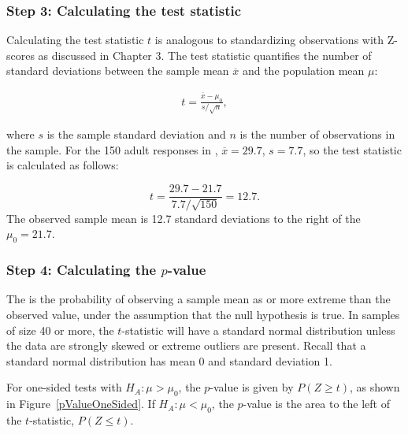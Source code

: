 \begin{spacing}{1.5}

\subsubsection{Step 3: Calculating the test statistic}

Calculating the test statistic $t$ is analogous to standardizing observations with Z-scores as discussed in Chapter 3. The test statistic quantifies the number of standard deviations between the sample mean $\overline{x}$ and the population mean $\mu$:

\begin{align*}
t=\frac{\overline{x}-\mu_0}{s/\sqrt{n}},
\end{align*}

where $s$ is the sample standard deviation and $n$ is the number of observations in the sample. For the 150 adult responses in , $\overline{x} = 29.7$, $s = 7.7$, so the test statistic is calculated as follows:

\[t = \frac{29.7 - 21.7}{7.7/\sqrt{150}} = 12.7.\]
The observed sample mean is 12.7 standard deviations to the right of the $\mu_0 = 21.7$.

\subsubsection{Step 4: Calculating the $p$-value}

The  is the probability of observing a sample mean as or more extreme than the observed value, under the assumption that the null hypothesis is true. In samples of size 40 or more, the $t$-statistic will have a standard normal distribution unless the data are strongly skewed or extreme outliers are present. Recall that a standard normal distribution has mean 0 and standard deviation 1.

For one-sided tests with $H_A: \mu > \mu_0$, the $p$-value is given by $P(Z \geq t)$, as shown in Figure~\ref{pValueOneSided}. If $H_A: \mu < \mu_0$, the $p$-value is the area to the left of the $t$-statistic, $P(Z \leq t)$.


\end{spacing}
